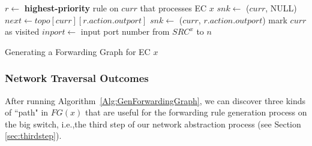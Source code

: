 \begin{algorithm}[h]
\DontPrintSemicolon
{}
 {
         {
                $r \gets$ \textbf{highest-priority} rule on $curr$ that processes EC $x$\;
                 {\label{Alg:LineDropPath1}
                        $snk \gets$ ($curr$, NULL)\;
                        \;
                        \KwRet\;
                }\label{Alg:LineDropPath2}
                $next \gets topo[curr][r.action.outport]$\;
                 {\label{Alg:LineForwardPath1}
                        $snk \gets$ ($curr$, $r.action.outport$)\;
                        \;
                        \KwRet\;
                }\label{Alg:LineForwardPath2}
                mark $curr$ as visited\;
                \;
        }
}\;
 {\label{Alg:LineStartDFS1}
         {
                $inport \gets$ input port number from $SRC^x$ to $n$\;
                \;
        }
}\label{Alg:LineStartDFS2}
\caption{Generating a Forwarding Graph for EC $x$\label{Alg:GenForwardingGraph}}
\end{algorithm}


\subsubsection{Network Traversal Outcomes}
After running Algorithm~\ref{Alg:GenForwardingGraph}, we can discover three kinds of ``path" in $FG(x)$ that are useful for the forwarding rule generation process on the big switch, i.e.,the third step of our network abstraction process (see Section \ref{sec:thirdstep}). 

